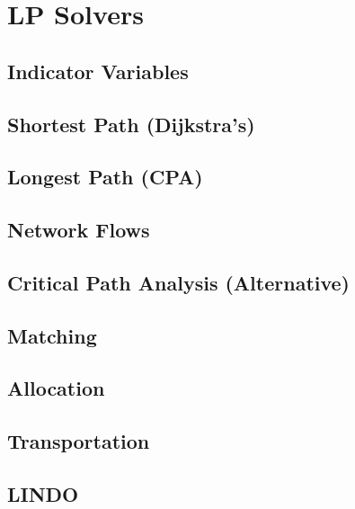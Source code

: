 \documentclass[../alevelmaths.tex]{subfiles}
\begin{document}
\chapter{LP Solvers}
\section{Indicator Variables}
\section{Shortest Path (Dijkstra's)}
\section{Longest Path (CPA)}
\section{Network Flows}
\section{Critical Path Analysis (Alternative)}
\section{Matching}
\section{Allocation}
\section{Transportation}
\section{LINDO}
\end{document}
